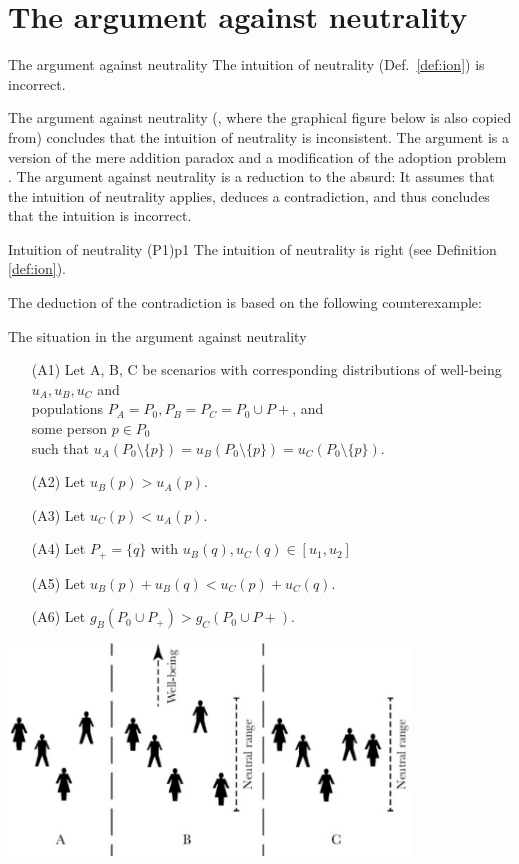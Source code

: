 \section{The argument against neutrality}
\label{sec:arg}

\begin{Theorem}{The argument against neutrality}{}
The intuition of neutrality (Def.~\ref{def:ion}) is incorrect.
\end{Theorem}

The argument against neutrality (, where the graphical figure below is also copied from) concludes that the intuition of neutrality is inconsistent. The argument is a version of the mere addition paradox \cite[p.~148]{broome_2004} and a modification of the adoption problem \cite[p.~161]{broome_2004}. The argument against neutrality is a reduction to the absurd: It assumes that the intuition of neutrality applies, deduces a contradiction, and thus concludes that the intuition is incorrect. 

\begin{Premise}{Intuition of neutrality (P1)}{p1}
The intuition of neutrality is right (see Definition \ref{def:ion}).
\end{Premise}

The deduction of the contradiction is based on the following counterexample: 

\begin{Counterexample}{The situation in the argument against neutrality}{}
\begin{enumerate}
\item[(A1)]
Let A, B, C be scenarios with  
corresponding distributions of well-being $u_A, u_B, u_C$ and \\
populations $P_A = P_0, P_B = P_C = P_0 \cup P+$, and \\
some person $p \in P_0$ \\
such that $u_A(P_0 \setminus \{p\}) = u_B(P_0 \setminus \{p\}) = u_C(P_0 \setminus \{p\}).$
\item[(A2)] Let $u_B(p) > u_A(p).$
\item[(A3)] Let $u_C(p) < u_A(p).$
\item[(A4)] Let $P_+ = \{q\}$ with $u_B(q), u_C(q) \in [u_1, u_2]$
\item[(A5)] Let $u_B(p) + u_B(q) < u_C(p) + u_C(q).$
\item[(A6)] Let $g_B(P_0 \cup P_+) > g_C(P_0 \cup P+)$. 
\end{enumerate}
\begin{center}
  \includegraphics[width=0.8\textwidth]{3-fig-1}
\end{center}
\end{Counterexample}

